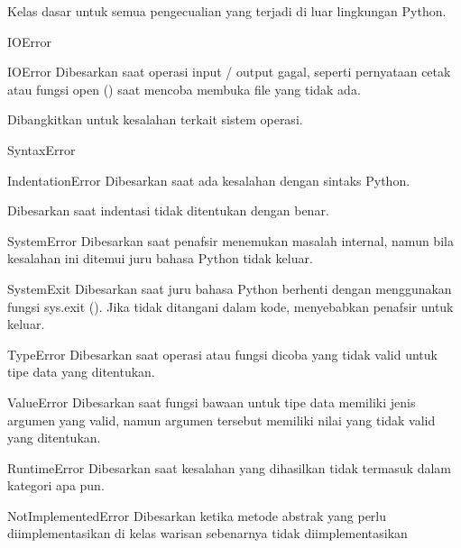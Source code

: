 Kelas dasar untuk semua pengecualian yang terjadi di luar lingkungan Python. \par
\vspace{12pt}
IOError \par
IOError \hspace*{0.5in} Dibesarkan saat operasi input / output gagal, seperti pernyataan cetak atau fungsi open () saat mencoba membuka file yang tidak ada. \par
Dibangkitkan untuk kesalahan terkait sistem operasi. \par
\vspace{12pt}
SyntaxError \par
IndentationError \hspace*{0.5in} Dibesarkan saat ada kesalahan dengan sintaks Python. \par
Dibesarkan saat indentasi tidak ditentukan dengan benar. \par
\vspace{12pt}
SystemError \hspace*{0.5in} Dibesarkan saat penafsir menemukan masalah internal, namun bila kesalahan ini ditemui juru bahasa Python tidak keluar. \par
\vspace{12pt}
SystemExit \hspace*{0.5in} Dibesarkan saat juru bahasa Python berhenti dengan menggunakan fungsi sys.exit (). Jika tidak ditangani dalam kode, menyebabkan penafsir untuk keluar. \par
\vspace{12pt}
TypeError \hspace*{0.5in} Dibesarkan saat operasi atau fungsi dicoba yang tidak valid untuk tipe data yang ditentukan. \par
\vspace{12pt}
ValueError \hspace*{0.5in} Dibesarkan saat fungsi bawaan untuk tipe data memiliki jenis argumen yang valid, namun argumen tersebut memiliki nilai yang tidak valid yang ditentukan. \par
\vspace{12pt}
RuntimeError \hspace*{0.5in} Dibesarkan saat kesalahan yang dihasilkan tidak termasuk dalam kategori apa pun. \par
\vspace{12pt}
NotImplementedError \hspace*{0.5in} Dibesarkan ketika metode abstrak yang perlu diimplementasikan di kelas warisan sebenarnya tidak diimplementasikan \par
